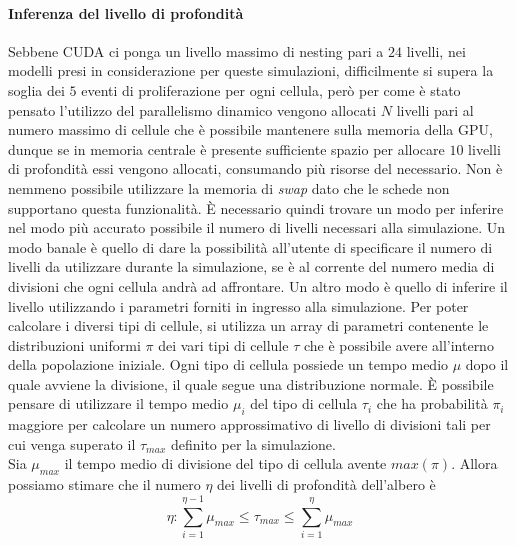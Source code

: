 \paragraph{Inferenza del livello di profondità}

Sebbene CUDA ci ponga un livello massimo di nesting pari a $24$ livelli,
nei modelli presi in considerazione per queste simulazioni, difficilmente
si supera la soglia dei $5$ eventi di proliferazione per ogni cellula,
però per come è stato pensato l'utilizzo del parallelismo dinamico vengono
allocati $N$ livelli pari al numero massimo di cellule che è possibile mantenere
sulla memoria della GPU, dunque se in memoria centrale è presente sufficiente
spazio per allocare $10$ livelli di profondità essi vengono allocati,
consumando più risorse del necessario. Non è nemmeno possibile utilizzare
la memoria di \textit{swap} dato che le schede non supportano questa
funzionalità.
È necessario quindi trovare un modo per inferire nel modo più accurato
possibile il numero di livelli necessari alla simulazione.
Un modo banale è quello di dare la possibilità all'utente di specificare il
numero di livelli da utilizzare durante la simulazione, se è al corrente
del numero media di divisioni che ogni cellula andrà ad affrontare.
Un altro modo è quello di inferire il livello utilizzando i parametri forniti
in ingresso alla simulazione.
Per poter calcolare i diversi tipi di cellule, si utilizza un array di
parametri contenente le distribuzioni uniformi $\pi$ dei vari tipi di cellule
$\tau$ che è possibile avere all'interno della popolazione iniziale.
Ogni tipo di cellula possiede un tempo medio $\mu$ dopo il quale avviene
la divisione, il quale segue una distribuzione normale.
È possibile pensare di utilizzare il tempo medio $\mu_{i}$ del tipo di cellula
$\tau_{i}$ che ha probabilità $\pi_{i}$ maggiore per calcolare un numero
approssimativo di livello di divisioni tali per cui venga superato il
$\tau_{max}$ definito per la simulazione.
\\
Sia $\mu_{max}$ il tempo medio di divisione
del tipo di cellula avente $max(\pi)$.
Allora possiamo stimare che il numero $\eta$ dei livelli di profondità
dell'albero è $$\eta : \sum\limits_{i=1}^{\eta - 1}
\mu_{max} \leqslant \tau_{max} \leqslant \sum\limits_{i=1}^{\eta} \mu_{max}$$

\begin{figure}[H]
    \centering
    \caption{}
\end{figure}


